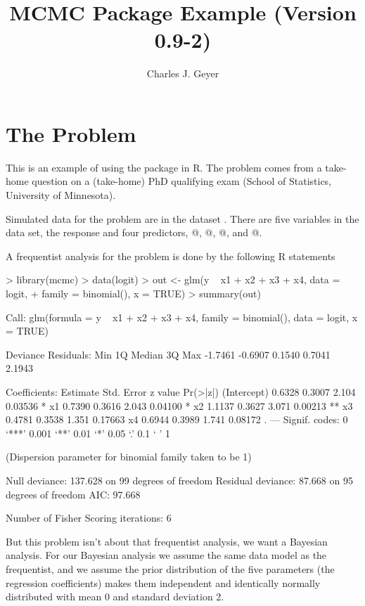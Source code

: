 \documentclass{article}
\begin{document}
\title{MCMC Package Example (Version 0.9-2)}
\author{Charles J. Geyer}
\maketitle

\section{The Problem}

This is an example of using the \verb@mcmc@ package in R.  The problem comes
from a take-home question on a (take-home) PhD qualifying exam
(School of Statistics, University of Minnesota).

Simulated data for the problem are in the dataset \verb@logit@.
There are five variables in the data set, the response \verb@y@
and four predictors, @, @, @, and @.

A frequentist analysis for the problem is done by the following R statements
\begin{Schunk}
\begin{Sinput}
> library(mcmc)
> data(logit)
> out <- glm(y ~ x1 + x2 + x3 + x4, data = logit,
+     family = binomial(), x = TRUE)
> summary(out)
\end{Sinput}
\begin{Soutput}
Call:
glm(formula = y ~ x1 + x2 + x3 + x4, family = binomial(), data = logit, 
    x = TRUE)

Deviance Residuals: 
    Min       1Q   Median       3Q      Max  
-1.7461  -0.6907   0.1540   0.7041   2.1943  

Coefficients:
            Estimate Std. Error z value Pr(>|z|)   
(Intercept)   0.6328     0.3007   2.104  0.03536 * 
x1            0.7390     0.3616   2.043  0.04100 * 
x2            1.1137     0.3627   3.071  0.00213 **
x3            0.4781     0.3538   1.351  0.17663   
x4            0.6944     0.3989   1.741  0.08172 . 
---
Signif. codes:  0 ‘***’ 0.001 ‘**’ 0.01 ‘*’ 0.05 ‘.’ 0.1 ‘ ’ 1 

(Dispersion parameter for binomial family taken to be 1)

    Null deviance: 137.628  on 99  degrees of freedom
Residual deviance:  87.668  on 95  degrees of freedom
AIC: 97.668

Number of Fisher Scoring iterations: 6
\end{Soutput}
\end{Schunk}

But this problem isn't about that frequentist analysis, we want a Bayesian
analysis.  For our Bayesian analysis we assume the same data model as the
frequentist, and we assume the prior distribution of the five parameters
(the regression coefficients) makes them independent and identically
normally distributed with mean 0 and standard deviation 2.
\end{document}
